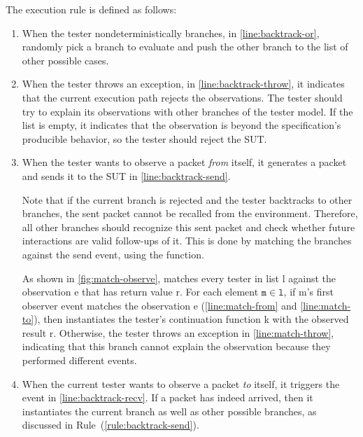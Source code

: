 The execution rule is defined as follows:
\begin{enumerate}
\item When the tester nondeterministically branches, in
\autoref{line:backtrack-or}, randomly pick a branch  to evaluate and
push the other branch  to the list of other possible cases.

\item When the  tester throws an exception, in
\autoref{line:backtrack-throw}, it indicates that the current execution path
rejects the observations.  The tester should try to explain its observations
with other branches of the tester model.  If the  list is empty, it
indicates that the observation is beyond the specification's producible
behavior, so the tester should reject the SUT.

\item When the tester wants to observe a packet {\em from} itself, it generates
a packet and sends it to the SUT in \autoref{line:backtrack-send}.

Note that if the current branch is rejected and the tester backtracks to other
branches, the sent packet cannot be recalled from the environment.  Therefore,
all other branches should recognize this sent packet and check whether future
interactions are valid follow-ups of it.  This is done by matching the branches
against the send event, using the  function.

  As shown in \autoref{fig:match-observe},  matches every
  tester in list \ilc l against the observation \ilc e that has return
  value \ilc r.  For each element $\texttt m\in\texttt l$, if \ilc m's first
  observer event  matches the observation \ilc e
  (\autoref{line:match-from} and \autoref{line:match-to}),
  then  instantiates the tester's continuation function \ilc
  k with the observed result \ilc r.  Otherwise, the tester throws an exception
  in \autoref{line:match-throw}, indicating that this branch cannot explain the
  observation because they performed different events.
  \label{rule:backtrack-send}

\item When the current tester wants to observe a packet {\em to} itself, it
  triggers the  event in \autoref{line:backtrack-recv}.  If a
  packet has indeed arrived, then it instantiates the current branch as well as
  other possible branches, as discussed in Rule~(\ref{rule:backtrack-send}).


\end{enumerate}
